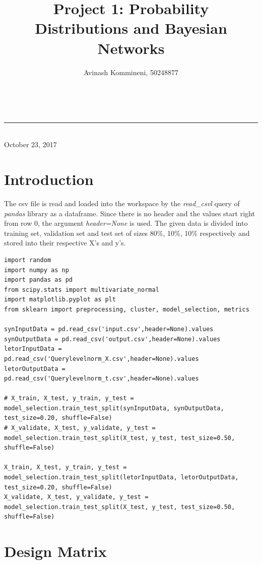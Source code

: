 \documentclass[a4paper,11pt]{article}
\makeatletter
\newcommand{\linia}{\rule{\linewidth}{0.5pt}}
\renewcommand{\maketitle}{
\begin{center}
\vspace{2ex}
{\LARGE \textsc{\@title}}
\vspace{1ex}
\\
\linia\\
\@author \hfill October 23, 2017
\vspace{4ex}
\end{center}
}
\makeatother
\begin{document}
\title{Project 1: Probability Distributions and Bayesian Networks}

\author{Avinash Kommineni, 50248877} 


\maketitle

\section*{Introduction}

The csv file is read and loaded into the workspace by the \textit{read\_csvl} query of \textit{pandas} library as a dataframe. Since there is no header and the values start right from row 0, the argument \textit{header=None} is used. The given data is divided into training set, validation set and test set of sizes 80\%, 10\%, 10\% respectively and stored into their respective X's and y's.

\begin{lstlisting}[label={list:first}]
import random
import numpy as np
import pandas as pd
from scipy.stats import multivariate_normal
import matplotlib.pyplot as plt
from sklearn import preprocessing, cluster, model_selection, metrics

synInputData = pd.read_csv('input.csv',header=None).values
synOutputData = pd.read_csv('output.csv',header=None).values
letorInputData = pd.read_csv('Querylevelnorm_X.csv',header=None).values
letorOutputData = pd.read_csv('Querylevelnorm_t.csv',header=None).values

# X_train, X_test, y_train, y_test = model_selection.train_test_split(synInputData, synOutputData, test_size=0.20, shuffle=False)
# X_validate, X_test, y_validate, y_test = model_selection.train_test_split(X_test, y_test, test_size=0.50, shuffle=False)

X_train, X_test, y_train, y_test = model_selection.train_test_split(letorInputData, letorOutputData, test_size=0.20, shuffle=False)
X_validate, X_test, y_validate, y_test = model_selection.train_test_split(X_test, y_test, test_size=0.50, shuffle=False)

\end{lstlisting}

\section*{Design Matrix}
\end{document}
